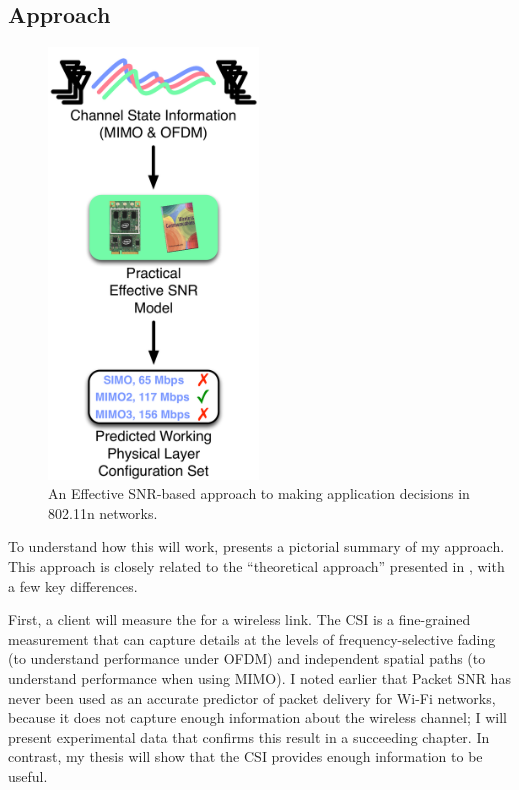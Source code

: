 \subsection{Approach}
\begin{figure}[t]
	\centering
	\includegraphics[width=2.2in]{figures/selection_esnr}
	\caption[Effective SNR-based approach to making application decisions]{\label{fig:selection_esnr}An Effective SNR-based approach to making application decisions in 802.11n networks.}
\end{figure}

To understand how this will work,  presents a pictorial summary of my approach. This approach is closely related to the ``theoretical approach'' presented in , with a few key differences.

First, a client will measure the  for a wireless link. The CSI is a fine-grained measurement that can capture details at the levels of frequency-selective fading (to understand performance under OFDM) and independent spatial paths (to understand performance when using MIMO). I noted earlier that Packet SNR has never been used as an accurate predictor of packet delivery for Wi-Fi networks, because it does not capture enough information about the wireless channel; I will present experimental data that confirms this result in a succeeding chapter. In contrast, my thesis will show that the CSI provides enough information to be useful.

